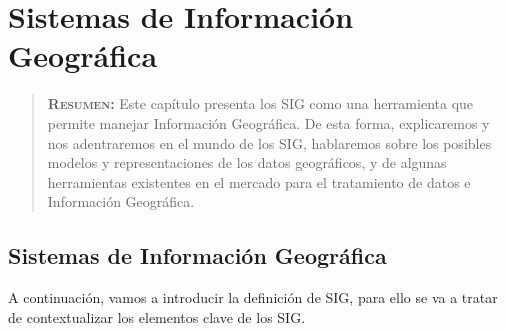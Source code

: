 

\chapter{Sistemas de Información Geográfica}
\label{ch:capitulo2}

\begin{quote}
  	{\bf\textsc{Resumen:}} Este capítulo presenta los SIG como una herramienta que permite manejar Información Geográfica. De esta forma, explicaremos y nos adentraremos en el mundo de los SIG, hablaremos sobre los posibles modelos y representaciones de los datos geográficos, y de algunas herramientas existentes en el mercado para el tratamiento de datos e Información Geográfica.
\end{quote}


\section{Sistemas de Información Geográfica}

A continuación, vamos a introducir la definición de SIG, para ello se va a tratar de contextualizar los elementos clave de los SIG.

